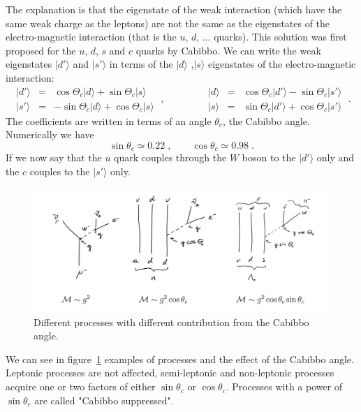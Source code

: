 \documentclass[12pt]{article}
\begin{document}
The explanation is that the eigenstate of the weak interaction (which have the same weak charge as the leptons) are not the same as the eigenstates of the electro-magnetic interaction (that is the $u$, $d$, ... quarks). This solution was first proposed for the $u$, $d$, $s$ and $c$ quarks by Cabibbo. We can write the weak eigenstates $|d'\rangle$ and $|s'\rangle$ in terms of the $|d\rangle$ ,$|s\rangle$ eigenstates of the electro-magnetic interaction:
\[
\begin{array}{ccc}
|d'\rangle &=& \cos\Theta_c |d\rangle+\sin\Theta_c |s\rangle\\ 
|s'\rangle &=& -\sin\Theta_c |d\rangle+\cos\Theta_c |s\rangle 
\end{array}\;,\qquad\qquad
\begin{array}{ccc}
|d\rangle &=& \cos\Theta_c |d'\rangle-\sin\Theta_c |s'\rangle\\ 
|s\rangle &=& \sin\Theta_c |d'\rangle+\cos\Theta_c |s'\rangle 
\end{array}\;.
\]  
The coefficients are written in terms of an angle $\theta_c$, the Cabibbo angle. Numerically we have
\[\sin \theta_c\simeq 0.22\;,\qquad \cos\theta_c\simeq0.98\;.\]
If we now say that the $u$ quark couples through the $W$ boson to the $|d'\rangle$ only and the $c$ couples to the $|s'\rangle$ only. 
\begin{figure}
\begin{center}
\includegraphics[scale=0.2]{images/cabibbo.png}
\end{center}
\caption{Different processes with different contribution from the Cabibbo angle.}\label{fig:cabibbo}
\end{figure}
We can see in figure~\ref{fig:cabibbo} examples of processes and the effect of the Cabibbo angle. Leptonic processes are not affected, semi-leptonic and non-leptonic processes acquire one or two factors of either $\sin\theta_c$ or $\cos\theta_c$. Processes with a power of $\sin\theta_c$ are called "Cabibbo suppressed".
\end{document}

